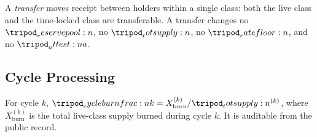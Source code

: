 \documentclass[../main.tex]{subfiles}
\begin{document}
\begin{definition}[Transfer]
    \label{def:operations:transfer}
    A \emph{transfer} moves receipt between holders within a single class: both the live
    class and the time-locked class are transferable. A transfer changes no
    $\reservepool{}$, no $\totsupply{}$, no $\ratefloor{}$, and no $\attest{a}$.
\end{definition}

\subsection{Cycle Processing}
\label{sec:operations:cycle}

\begin{definition}
    \label{def:operations:cycle-burn-fraction}
    For cycle $k$, $\cycleburnfrac{k} = X_{\mathrm{burn}}^{(k)}/\totsupply{}^{(k)}$, where
    $X_{\mathrm{burn}}^{(k)}$ is the total live-class supply burned during cycle $k$. It is
    auditable from the public record.
\end{definition}
\end{document}
